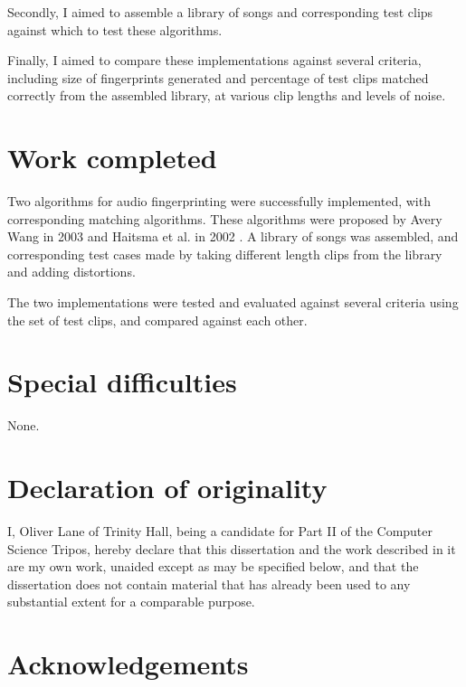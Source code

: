 \documentclass[12pt,a4paper,twoside,openright]{report}
\begin{document}
Secondly, I aimed to assemble a library of songs and corresponding test clips against which to test these algorithms.

Finally, I aimed to compare these implementations against several criteria, including size of fingerprints generated and percentage of test clips matched correctly from the assembled library, at various clip lengths and levels of noise.

\section*{Work completed}

Two algorithms for audio fingerprinting were successfully implemented, with corresponding matching algorithms. These algorithms were proposed by Avery Wang in 2003 \cite{Wang03} and Haitsma et al. in 2002 \cite{Haitsma02}. A library of songs was assembled, and corresponding test cases made by taking different length clips from the library and adding distortions.

The two implementations were tested and evaluated against several criteria using the set of test clips, and compared against each other.

\section*{Special difficulties}

None.

 
\newpage
\section*{Declaration of originality}

I, Oliver Lane of Trinity Hall, being a candidate for Part II of the Computer Science Tripos, hereby declare that this dissertation and the work described in  it are my own work, unaided except as may be specified below, and that the  dissertation does not contain material that has already been used to any substantial extent for a comparable purpose.

\bigskip
\bigskip
\bigskip


\bigskip
\bigskip


\newpage
\section*{Acknowledgements}
\end{document}
